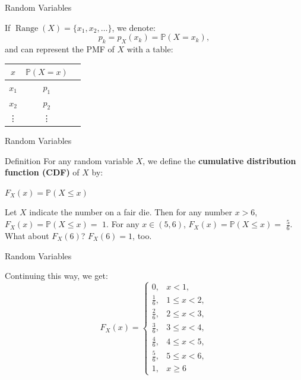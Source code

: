 \documentclass{beamer}
\newcommand{\PP}{\mathbb{P}}
\begin{document}
\begin{frame}{Random Variables}

    If $\operatorname{Range}(X) = \{x_1, x_2, \dots\}$, we denote:
    \[
    p_k = p_X(x_k) = \PP(X=x_k),
    \]
    \pause and can represent the PMF of $X$ with a table:
   
\begin{table}[h]
\centering
\begin{tabular}{|c|c|c|}
\hline
$x$ & $\PP(X=x)$ \\
\hline
$x_1$ & $p_1$ \\
$x_2$ & $p_2$ \\
\vdots & \vdots \\
\hline
\end{tabular}
\end{table}


\end{frame}

\begin{frame}{Random Variables}
    
\begin{block}{Definition}
    For any random variable \( X \), we define the \textbf{cumulative distribution function (CDF)} of \( X \) by:
\begin{center}
    $F_X(x) = \PP(X \leq x)$
\end{center}%

\end{block}\pause
\begin{example}
    Let $X$ indicate the number on a fair die. Then for any number $x >6$, $F_X(x) = \PP(X \le x) = $ \pause $ 1$. \pause For any $x\in(5,6)$,  $F_X(x) = \PP(X \le x) = $ \pause $ \frac{5}{6}$. \pause What about $F_X(6)$? \pause $F_X(6) = 1$, too. 
\end{example}

\end{frame}

\begin{frame}{Random Variables}
    \begin{example}
        Continuing this way, we get:
    \[ F_X(x)=\begin{cases}
    0,&x<1,\\
    \frac{1}{6},&1\le x<2,\\
    \frac{2}{6},&2\le x<3,\\
    \frac{3}{6},&3\le x<4,\\
    \frac{4}{6},&4\le x<5,\\
    \frac{5}{6},&5\le x<6,\\
    1,&x\ge6
    \end{cases}
    \]
    
    \end{example}

\end{frame}
\end{document}
